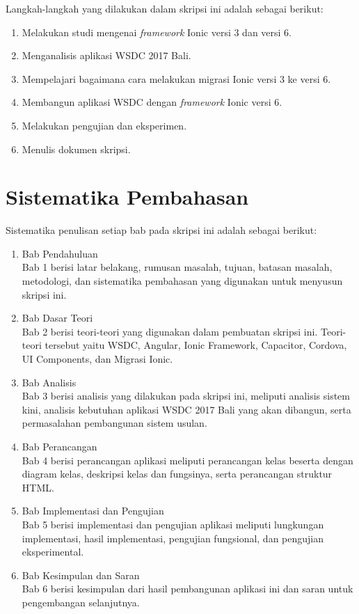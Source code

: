 Langkah-langkah yang dilakukan dalam skripsi ini adalah sebagai berikut:

\begin{enumerate}
	\item Melakukan studi mengenai {\it framework} Ionic versi 3 dan versi 6.
	\item Menganalisis aplikasi WSDC 2017 Bali.
	\item Mempelajari bagaimana cara melakukan migrasi Ionic versi 3 ke versi 6.
	\item Membangun aplikasi WSDC dengan {\it framework} Ionic versi 6. 
	\item Melakukan pengujian dan eksperimen.
	\item Menulis dokumen skripsi.
\end{enumerate}


\section{Sistematika Pembahasan}
\label{sec:sispem}

Sistematika penulisan setiap bab pada skripsi ini adalah sebagai berikut:
\begin{enumerate}
	\item Bab Pendahuluan \\
	Bab 1 berisi latar belakang, rumusan masalah, tujuan, batasan masalah, metodologi, dan sistematika pembahasan yang digunakan untuk menyusun skripsi ini.
	\item Bab Dasar Teori \\
	Bab 2 berisi teori-teori yang digunakan dalam pembuatan skripsi ini. Teori-teori tersebut yaitu WSDC, Angular, Ionic Framework, Capacitor, Cordova, UI Components, dan Migrasi Ionic.
	\item Bab Analisis \\
	Bab 3 berisi analisis yang dilakukan pada skripsi ini, meliputi analisis sistem kini, analisis kebutuhan aplikasi WSDC 2017 Bali yang akan dibangun, serta permasalahan pembangunan sistem usulan.
	\item Bab Perancangan \\
	Bab 4 berisi perancangan aplikasi meliputi perancangan kelas beserta dengan diagram kelas, deskripsi kelas dan fungsinya, serta perancangan struktur HTML.
	\item Bab Implementasi dan Pengujian \\
	Bab 5 berisi implementasi dan pengujian aplikasi meliputi lungkungan implementasi, hasil implementasi, pengujian fungsional, dan pengujian eksperimental.
	\item Bab Kesimpulan dan Saran \\
	Bab 6 berisi kesimpulan dari hasil pembangunan aplikasi ini dan saran untuk pengembangan selanjutnya.
	\end{enumerate}
